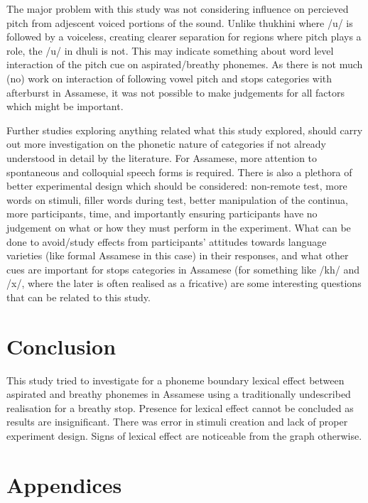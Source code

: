 \documentclass[12pt, english]{article}
\begin{document}
The major problem with this study was not considering influence on percieved pitch from adjescent voiced portions of the sound. Unlike thukhini where /u/ is followed by a voiceless, creating clearer separation for regions where pitch plays a role, the /u/ in dhuli is not. This may indicate something about word level interaction of the pitch cue on aspirated/breathy phonemes. As there is not much (no) work on interaction of following vowel pitch and stops categories with afterburst in Assamese, it was not possible to make judgements for all factors which might be important. \\ \par

Further studies exploring anything related what this study explored, should carry out more investigation on the phonetic nature of categories if not already understood in detail by the literature. For Assamese, more attention to spontaneous and colloquial speech forms is required. There is also a plethora of better experimental design which should be considered: non-remote test, more words on stimuli, filler words during test, better manipulation of the continua, more participants, time, and importantly ensuring participants have no judgement on what or how they must perform in the experiment. What can be done to avoid/study effects from participants' attitudes towards language varieties (like formal Assamese in this case) in their responses, and what other cues are important for stops categories in Assamese (for something like /kh/ and /x/, where the later is often realised as a fricative) are some interesting questions that can be related to this study.



\section*{Conclusion}
This study tried to investigate for a phoneme boundary lexical effect between aspirated and breathy phonemes in Assamese using a traditionally undescribed realisation for a breathy stop. Presence for lexical effect cannot be concluded as results are insignificant. There was error in stimuli creation and lack of proper experiment design. Signs of lexical effect are noticeable from the graph otherwise.


\newpage
\section*{Appendices}
\end{document}
